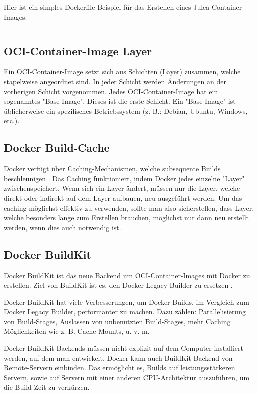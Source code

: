 Hier ist ein simples Dockerfile Beispiel für das Erstellen eines Julea Container-Images:

\inputminted{docker}{./code-examples/Dockerfile.example}

\subsection{OCI-Container-Image Layer}

Ein OCI-Container-Image setzt sich aus Schichten (Layer) zusammen, welche stapelweise angeordnet sind. In jeder Schicht werden Änderungen an der vorherigen Schicht vorgenommen. Jedes OCI-Container-Image hat ein sogenanntes "Base-Image". Dieses ist die erste Schicht. Ein "Base-Image" ist üblicherweise ein spezifisches Betriebssystem (z. B.: Debian, Ubuntu, Windows, etc.).

\subsection{Docker Build-Cache}

Docker verfügt über Caching-Mechanismen, welche subsequente Builds beschleunigen \cite{dockerCache}. Das Caching funktioniert, indem Docker jedes einzelne "Layer" zwischenspeichert. Wenn sich ein Layer ändert, müssen nur die Layer, welche direkt oder indirekt auf dem Layer aufbauen, neu ausgeführt werden. Um das caching möglichst effektiv zu verwenden, sollte man also sicherstellen, dass Layer, welche besonders lange zum Erstellen brauchen, möglichst nur dann neu erstellt werden, wenn dies auch notwendig ist.

\subsection{Docker BuildKit}

Docker BuildKit ist das neue Backend um OCI-Container-Images mit Docker zu erstellen. Ziel von BuildKit ist es, den Docker Legacy Builder zu ersetzen \cite{dockerBuildKit}.

Docker BuildKit hat viele Verbesserungen, um Docker Builds, im Vergleich zum Docker Legacy Builder, performanter zu machen. Dazu zählen: Parallelisierung von Build-Stages, Auslassen von unbenutzten Build-Stages, mehr Caching Möglichkeiten wie z. B. Cache-Mounts, u. v. m.

Docker BuildKit Backends müssen nicht explizit auf dem Computer installiert werden, auf dem man entwickelt. Docker kann auch BuildKit Backend von Remote-Servern einbinden. Das ermöglicht es, Builds auf leistungsstärkeren Servern, sowie auf Servern mit einer anderen CPU-Architektur auszuführen, um die Build-Zeit zu verkürzen.

